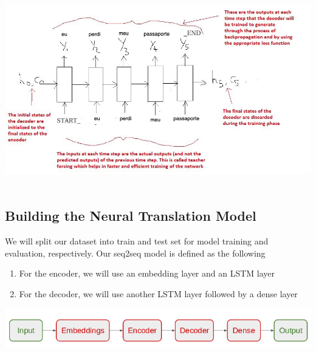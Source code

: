 \documentclass[runningheads]{llncs}
\begin{document}
	\begin{minipage}{\linewidth}
	 	\begin{center}
	 		\includegraphics[width=\linewidth]{decoder.jpeg}
	 		\label{fig:Decoder LSTM}~\cite{ref_url6}
	 	\end{center}
	 \end{minipage}
	 \afterpage{\clearpage}
	 
	\subsection{Building the Neural Translation Model}
	We will split our dataset into train and test set for model training and evaluation, respectively.
	Our seq2seq model is defined as the following

	\begin{enumerate}
		\item For the encoder, we will use an embedding layer and an LSTM layer
		\item For the decoder, we will use another LSTM layer followed by a dense layer
	\end{enumerate}

	\begin{minipage}{\linewidth}
		\begin{center}
			\includegraphics[width=\linewidth]{architecture.png}
			\label{fig:Model Architectture}~\cite{ref_url7}
		\end{center}
	\end{minipage}
	\afterpage{\clearpage}
\end{document}
